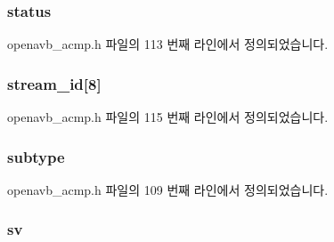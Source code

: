 \subsubsection[{\texorpdfstring{status}{status}}]{ status}\hypertarget{structopenavb__acmp__control__header__t_aa2ef32d18f7a5a009b93a17834fe3828}{}\label{structopenavb__acmp__control__header__t_aa2ef32d18f7a5a009b93a17834fe3828}


openavb\+\_\+acmp.\+h 파일의 113 번째 라인에서 정의되었습니다.

\subsubsection[{\texorpdfstring{stream\+\_\+id}{stream_id}}]{ stream\+\_\+id\mbox{[}8\mbox{]}}\hypertarget{structopenavb__acmp__control__header__t_a75d8c196686b96d97e0a271ac7b70da8}{}\label{structopenavb__acmp__control__header__t_a75d8c196686b96d97e0a271ac7b70da8}


openavb\+\_\+acmp.\+h 파일의 115 번째 라인에서 정의되었습니다.

\subsubsection[{\texorpdfstring{subtype}{subtype}}]{ subtype}\hypertarget{structopenavb__acmp__control__header__t_ad61c2796f8f447c2ca8979f4aeccf351}{}\label{structopenavb__acmp__control__header__t_ad61c2796f8f447c2ca8979f4aeccf351}


openavb\+\_\+acmp.\+h 파일의 109 번째 라인에서 정의되었습니다.

\subsubsection[{\texorpdfstring{sv}{sv}}]{ sv}\hypertarget{structopenavb__acmp__control__header__t_adc62d14194c9ab3aff5b994caef8bcb0}{}\label{structopenavb__acmp__control__header__t_adc62d14194c9ab3aff5b994caef8bcb0}


